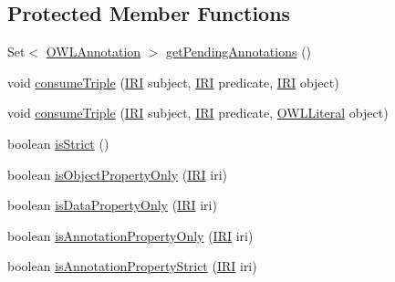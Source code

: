\subsection*{Protected Member Functions}
\begin{DoxyCompactItemize}
\item 
Set$<$ \hyperlink{interfaceorg_1_1semanticweb_1_1owlapi_1_1model_1_1_o_w_l_annotation}{O\-W\-L\-Annotation} $>$ \hyperlink{classorg_1_1coode_1_1owlapi_1_1rdfxml_1_1parser_1_1_abstract_triple_handler_a247d0e33eb9f1aad319f8dba18858a49}{get\-Pending\-Annotations} ()
\item 
void \hyperlink{classorg_1_1coode_1_1owlapi_1_1rdfxml_1_1parser_1_1_abstract_triple_handler_a1147fb38ee5c6e1c90c8c6956eabee47}{consume\-Triple} (\hyperlink{classorg_1_1semanticweb_1_1owlapi_1_1model_1_1_i_r_i}{I\-R\-I} subject, \hyperlink{classorg_1_1semanticweb_1_1owlapi_1_1model_1_1_i_r_i}{I\-R\-I} predicate, \hyperlink{classorg_1_1semanticweb_1_1owlapi_1_1model_1_1_i_r_i}{I\-R\-I} object)
\item 
void \hyperlink{classorg_1_1coode_1_1owlapi_1_1rdfxml_1_1parser_1_1_abstract_triple_handler_af7b891653799edff56ea661ec4f3a20f}{consume\-Triple} (\hyperlink{classorg_1_1semanticweb_1_1owlapi_1_1model_1_1_i_r_i}{I\-R\-I} subject, \hyperlink{classorg_1_1semanticweb_1_1owlapi_1_1model_1_1_i_r_i}{I\-R\-I} predicate, \hyperlink{interfaceorg_1_1semanticweb_1_1owlapi_1_1model_1_1_o_w_l_literal}{O\-W\-L\-Literal} object)
\item 
boolean \hyperlink{classorg_1_1coode_1_1owlapi_1_1rdfxml_1_1parser_1_1_abstract_triple_handler_ac3026fc1ea7e5a3dfadd07da1c29f9f3}{is\-Strict} ()
\item 
boolean \hyperlink{classorg_1_1coode_1_1owlapi_1_1rdfxml_1_1parser_1_1_abstract_triple_handler_affb7cb8b609737d8346397056a9c646d}{is\-Object\-Property\-Only} (\hyperlink{classorg_1_1semanticweb_1_1owlapi_1_1model_1_1_i_r_i}{I\-R\-I} iri)
\item 
boolean \hyperlink{classorg_1_1coode_1_1owlapi_1_1rdfxml_1_1parser_1_1_abstract_triple_handler_a563335b9745d9262591e21ce060d40db}{is\-Data\-Property\-Only} (\hyperlink{classorg_1_1semanticweb_1_1owlapi_1_1model_1_1_i_r_i}{I\-R\-I} iri)
\item 
boolean \hyperlink{classorg_1_1coode_1_1owlapi_1_1rdfxml_1_1parser_1_1_abstract_triple_handler_aadb2a6b7c6187dcf2857080e529b28e0}{is\-Annotation\-Property\-Only} (\hyperlink{classorg_1_1semanticweb_1_1owlapi_1_1model_1_1_i_r_i}{I\-R\-I} iri)
\item 
boolean \hyperlink{classorg_1_1coode_1_1owlapi_1_1rdfxml_1_1parser_1_1_abstract_triple_handler_aeadcb47f09e5992dfe11827a44d995f1}{is\-Annotation\-Property\-Strict} (\hyperlink{classorg_1_1semanticweb_1_1owlapi_1_1model_1_1_i_r_i}{I\-R\-I} iri)

\end{DoxyCompactItemize}
